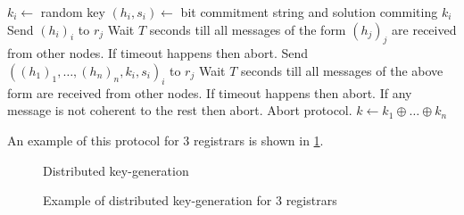 \begin{algorithm}
  \begin{algorithmic}[1]
  \STATE $k_i \leftarrow $ random key
  \STATE $(h_i, s_i) \leftarrow $ bit commitment string and solution commiting
  $k_i$
    \STATE Send $(h_i)_{i}$ to $r_j$
  \ENDFOR
  \STATE Wait $T$ seconds till all messages of the form $(h_j)_j$ are received
  from other nodes. If timeout happens then abort.
    \STATE Send $\left( (h_1)_1, \ldots, (h_n)_{n}, k_i, s_i\right)_i$ to $r_j$
  \ENDFOR
  \STATE Wait $T$ seconds till all messages of the above form are received
  from other nodes. If timeout happens then abort. If any message is not
  coherent to the rest then abort.
      \STATE Abort protocol.
    \ENDIF
  \ENDFOR
  \STATE $k \leftarrow k_1 \oplus \ldots \oplus k_n$
\end{algorithmic}
  \caption{Distributed key generation algorithm generating random key $k$}
  \label{alg:key_gen_alg}
\end{algorithm}

An example of this protocol for 3 registrars is shown in
\ref{fig:key_gen_example}.

\begin{figure}
\begin{msc}{Distributed key-generation}
\setlength{\instdist}{5.5cm}
\setlength{\envinstdist}{3cm}
\nextlevel[5]
\nextlevel[2]
\nextlevel[2]
\nextlevel[2]
\nextlevel[2]
\nextlevel[2]
\nextlevel[2]
\nextlevel[2]
\nextlevel[2]
\nextlevel[2]
\nextlevel[4]
\end{msc}
\caption{Example of distributed key-generation for 3 registrars}
\label{fig:key_gen_example}
\end{figure}

